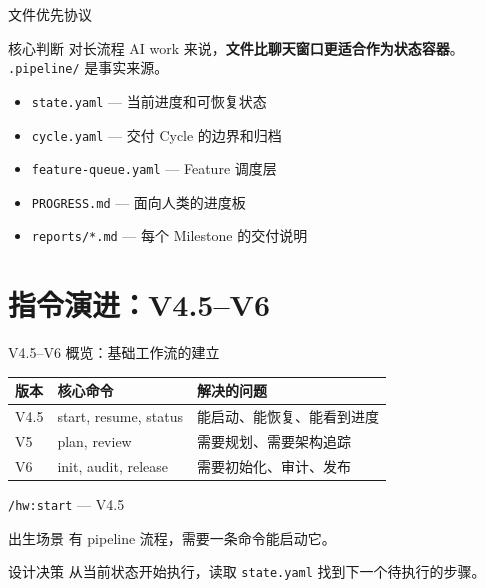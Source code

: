 \documentclass[theme=workflow,aspectratio=169,fontset=tech]{Hypo-Slide}
\begin{document}
\begin{frame}{文件优先协议}
  \begin{block}{核心判断}
    对长流程 AI work 来说，\textbf{文件比聊天窗口更适合作为状态容器}。
    \texttt{.pipeline/} 是事实来源。
  \end{block}
  \begin{itemize}
    \item \texttt{state.yaml} — 当前进度和可恢复状态
    \item \texttt{cycle.yaml} — 交付 Cycle 的边界和归档
    \item \texttt{feature-queue.yaml} — Feature 调度层
    \item \texttt{PROGRESS.md} — 面向人类的进度板
    \item \texttt{reports/*.md} — 每个 Milestone 的交付说明
  \end{itemize}
\end{frame}


\section{指令演进：V4.5--V6}

\begin{frame}{V4.5--V6 概览：基础工作流的建立}
  \centering
  \begin{tabular}{lll}
    \toprule
    版本 & 核心命令 & 解决的问题 \\
    \midrule
    V4.5 & start, resume, status & 能启动、能恢复、能看到进度 \\
    V5   & plan, review           & 需要规划、需要架构追踪 \\
    V6   & init, audit, release   & 需要初始化、审计、发布 \\
    \bottomrule
  \end{tabular}
\end{frame}

\begin{frame}{\texttt{/hw:start} — V4.5}
  \begin{block}{出生场景}
    有 pipeline 流程，需要一条命令能启动它。
  \end{block}
  \begin{block}{设计决策}
    从当前状态开始执行，读取 \texttt{state.yaml} 找到下一个待执行的步骤。
  \end{block}
\end{frame}
\end{document}
